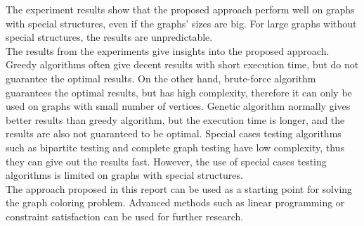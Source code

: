\documentclass[a4paper]{report}
\begin{document}
	The experiment results show that the proposed approach perform well on graphs with special structures, even if the graphs' sizes are big. For large graphs without special structures, the results are unpredictable. \\
	
	The results from the experiments give insights into the proposed approach. Greedy algorithms often give decent results with short execution time, but do not guarantee the optimal results. On the other hand, brute-force algorithm guarantees the optimal results, but has high complexity, therefore it can only be used on graphs with small number of vertices. Genetic algorithm normally gives better results than greedy algorithm, but the execution time is longer, and the results are also not guaranteed to be optimal. Special cases testing algorithms such as bipartite testing and complete graph testing have low complexity, thus they can give out the results fast. However, the use of special cases testing algorithms is limited on graphs with special structures. \\
	
	The approach proposed in this report can be used as a starting point for solving the graph coloring problem. Advanced methods such as linear programming or constraint satisfaction can be used for further research.
	
	
	
	
\end{document}
